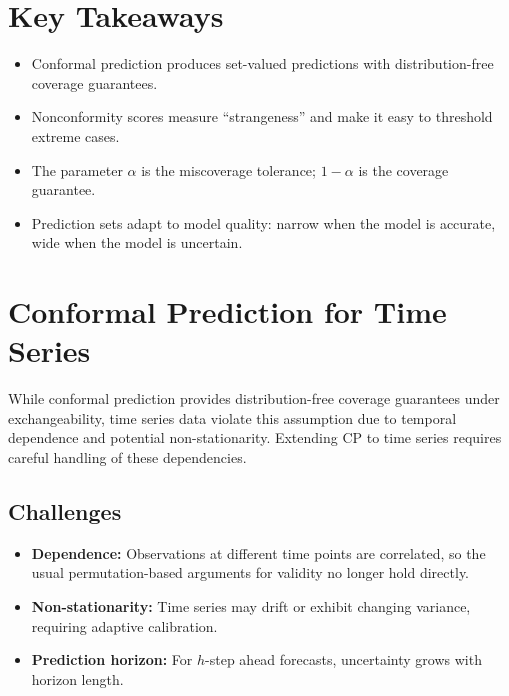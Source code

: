 \documentclass[11pt]{article}
\theoremstyle{remark}
\begin{document}
\section{Key Takeaways}
\begin{itemize}
    \item Conformal prediction produces set-valued predictions with distribution-free coverage guarantees.
    \item Nonconformity scores measure ``strangeness'' and make it easy to threshold extreme cases.
    \item The parameter $\alpha$ is the miscoverage tolerance; $1-\alpha$ is the coverage guarantee.
    \item Prediction sets adapt to model quality: narrow when the model is accurate, wide when the model is uncertain.
\end{itemize}

\section{Conformal Prediction for Time Series}

While conformal prediction provides distribution-free coverage guarantees under exchangeability,
time series data violate this assumption due to temporal dependence and potential non-stationarity.
Extending CP to time series requires careful handling of these dependencies.

\subsection*{Challenges}
\begin{itemize}
    \item \textbf{Dependence:} Observations at different time points are correlated, so the usual permutation-based arguments for validity no longer hold directly.
    \item \textbf{Non-stationarity:} Time series may drift or exhibit changing variance, requiring adaptive calibration.
    \item \textbf{Prediction horizon:} For $h$-step ahead forecasts, uncertainty grows with horizon length.
\end{itemize}
\end{document}

